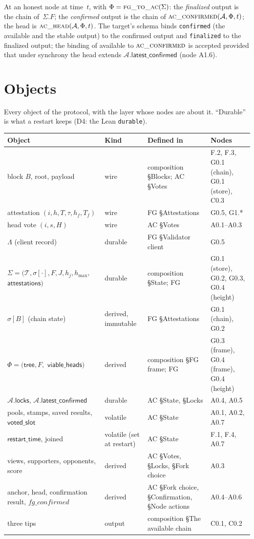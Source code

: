 \documentclass{article}
\newcommand{\T}{\mathcal T}
\newcommand{\hmax}{h_{\max}}
\newcommand{\AC}{\mathcal A}
\newcommand{\Fr}{\Phi}
\newcommand{\allowed}{\mathsf{viable\_heads}}
\newcommand{\fname}[1]{\text{\textsc{#1}}}
\newcommand{\latestConfirmed}{\mathsf{latest\_confirmed}}
\begin{document}
At an honest node at time~$t$, with $\Fr=\fname{fg\_to\_ac}(\Sigma)$: the
\emph{finalized} output is the chain of~$\Sigma.F$; the \emph{confirmed}
output is the chain of $\fname{ac\_confirmed}(\AC,\Fr,t)$; the head is
$\fname{ac\_head}(\AC,\Fr,t)$.  The target's schema binds \texttt{confirmed}
(the available and the stable output) to the confirmed output and
\texttt{finalized} to the finalized output; the binding of available to
$\fname{ac\_confirmed}$ is accepted provided that under
synchrony the head extends $\AC.\latestConfirmed$ (node A1.6).

\section{Objects}\label{sec:objects}

Every object of the protocol, with the layer whose nodes are about it.
``Durable'' is what a restart keeps (D4: the Lean \texttt{durable}).

\begin{longtable}{@{}>{\raggedright\arraybackslash}p{3.6cm}>{\raggedright\arraybackslash}p{2.0cm}>{\raggedright\arraybackslash}p{4.2cm}>{\raggedright\arraybackslash}p{3.2cm}@{}}
\hline
Object & Kind & Defined in & Nodes\\
\hline
block $B$, root, payload & wire & composition \S Blocks; AC \S Votes & F.2, F.3, G0.1 (chain), G0.1 (store), C0.3\\
attestation $(i,h,T,\tau,h_f,T_f)$ & wire & FG \S Attestations & G0.5, G1.*\\
head vote $(i,s,H)$ & wire & AC \S Votes & A0.1--A0.3\\
$\Lambda$ (client record) & durable & FG \S Validator client & G0.5\\
$\Sigma=(\T,\sigma[\cdot],F,J,h_j,\hmax,$ $\mathsf{attestations})$ & durable & composition \S State; FG & G0.1 (store), G0.2, G0.3, G0.4 (height)\\
$\sigma[B]$ (chain state) & derived, immutable & FG \S Attestations & G0.1 (chain), G0.2\\
$\Fr=(\mathsf{tree},F,$ $\allowed)$ & derived & composition \S FG frame; FG & G0.3 (frame), G0.4 (frame), G0.4 (height)\\
$\AC.\mathsf{locks}$, $\AC.\latestConfirmed$ & durable & AC \S State, \S Locks & A0.4, A0.5\\
pools, stamps, saved results, $\mathsf{voted\_slot}$ & volatile & AC \S State & A0.1, A0.2, A0.7\\
$\mathsf{restart\_time}$, joined & volatile (set at restart) & AC \S State & F.1, F.4, A0.7\\
views, supporters, opponents, score & derived & AC \S Votes, \S Locks, \S Fork choice & A0.3\\
anchor, head, confirmation result, $\mathit{fg\_confirmed}$ & derived & AC \S Fork choice, \S Confirmation, \S Node actions & A0.4--A0.6\\
three tips & output & composition \S The available chain & C0.1, C0.2\\
\hline
\end{longtable}
\end{document}
